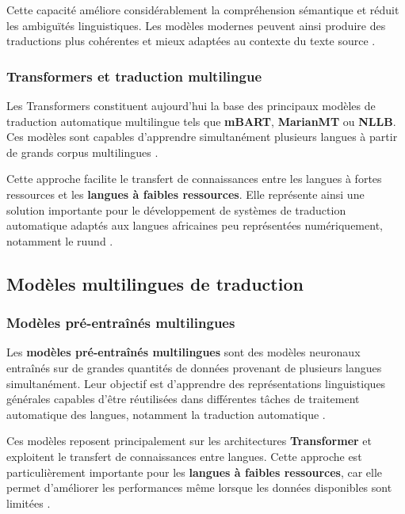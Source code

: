 Cette capacité améliore considérablement la compréhension sémantique et réduit les ambiguïtés linguistiques. Les modèles modernes peuvent ainsi produire des traductions plus cohérentes et mieux adaptées au contexte du texte source \cite{rakhimov2024enhancing}.

\subsubsection{Transformers et traduction multilingue}

Les Transformers constituent aujourd'hui la base des principaux modèles de traduction automatique multilingue tels que \textbf{mBART}, \textbf{MarianMT} ou \textbf{NLLB}. Ces modèles sont capables d'apprendre simultanément plusieurs langues à partir de grands corpus multilingues \cite{rakhimov2024enhancing}.

Cette approche facilite le transfert de connaissances entre les langues à fortes ressources et les \textbf{langues à faibles ressources}. Elle représente ainsi une solution importante pour le développement de systèmes de traduction automatique adaptés aux langues africaines peu représentées numériquement, notamment le ruund \cite{mandiya2026lingala}.

\subsection{Modèles multilingues de traduction}

\subsubsection{Modèles pré-entraînés multilingues}

Les \textbf{modèles pré-entraînés multilingues} sont des modèles neuronaux entraînés sur de grandes quantités de données provenant de plusieurs langues simultanément. Leur objectif est d'apprendre des représentations linguistiques générales capables d'être réutilisées dans différentes tâches de traitement automatique des langues, notamment la traduction automatique \cite{ranathunga2023neural}.

Ces modèles reposent principalement sur les architectures \textbf{Transformer} et exploitent le transfert de connaissances entre langues. Cette approche est particulièrement importante pour les \textbf{langues à faibles ressources}, car elle permet d'améliorer les performances même lorsque les données disponibles sont limitées \cite{nguyen2017transfer}.

